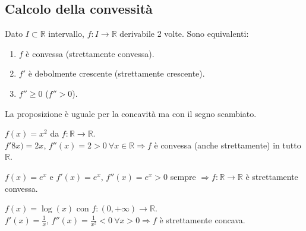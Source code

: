 \vspace{15pt}
\subsection{Calcolo della convessità}
\begin{proposition}
Dato $I \subset \mathbb{R}$ intervallo, $f: I \to \mathbb{R}$ derivabile 2 volte. Sono equivalenti:
\begin{enumerate}
    \item $f$ è convessa (strettamente convessa).
    \item $f'$ è debolmente crescente (strettamente crescente).
    \item $f'' \geq 0$ ($f'' > 0$).
\end{enumerate}
\end{proposition}

\begin{note}
La proposizione è uguale per la concavità ma con il segno scambiato.
\end{note}

\begin{example}
$f(x) = x^2$ da $f:\mathbb{R} \to \mathbb{R}$.\\
$f'8x) = 2x$, $f''(x) = 2 > 0 \: \forall x \in \mathbb{R} \Longrightarrow f$ è convessa (anche strettamente) in tutto $\mathbb{R}$.
\end{example}

\begin{example}
$f(x) = e^x$ e $f'(x) = e^x$, $f''(x) = e^x > 0$ sempre $\Longrightarrow f:\mathbb{R} \to \mathbb{R}$ è strettamente convessa.
\end{example}

\begin{example}
$f(x) = \log(x)$ con $f:(0,+\infty) \to \mathbb{R}$.\\
$f'(x) = \frac{1}{x}$, $f''(x) = \frac{1}{x^2} < 0 \: \forall x > 0 \Longrightarrow f$ è strettamente concava. 
\end{example}

